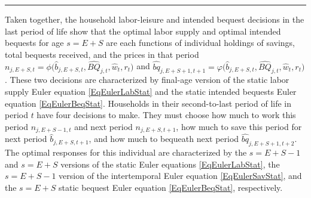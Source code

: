 \documentclass[letterpaper,12pt]{article}
\theoremstyle{definition}
\begin{document}
    \hrule
    \begin{spacing}{1.5}
    \vspace{10mm}

    \noindent Taken together, the household labor-leisure and intended bequest decisions in the last period of life show that the optimal labor supply and optimal intended bequests for age $s=E+S$ are each functions of individual holdings of savings, total bequests received, and the prices in that period $n_{j,E+S,t}=\phi\bigl(\hat{b}_{j,E+S,t},\hat{BQ}_{j,t},\hat{w}_t,r_t\bigr)$ and $\hat{bq}_{j,E+S+1,t+1}=\varphi\bigl(\hat{b}_{j,E+S,t},\hat{BQ}_{j,t},\hat{w}_t,r_t\bigr)$. These two decisions are characterized by final-age version of the static labor supply Euler equation \eqref{EqEulerLabStat} and the static intended bequests Euler equation \eqref{EqEulerBeqStat}. Households in their second-to-last period of life in period $t$ have four decisions to make. They must choose how much to work this period $n_{j,E+S-1,t}$ and next period $n_{j,E+S,t+1}$, how much to save this period for next period $\hat{b}_{j,E+S,t+1}$, and how much to bequeath next period $\hat{bq}_{j,E+S+1,t+2}$. The optimal responses for this individual are characterized by the $s=E+S-1$ and $s=E+S$ versions of the static Euler equations \eqref{EqEulerLabStat}, the $s=E+S-1$ version of the intertemporal Euler equation \eqref{EqEulerSavStat}, and the $s=E+S$ static bequest Euler equation \eqref{EqEulerBeqStat}, respectively.


\end{spacing}
\end{document}
